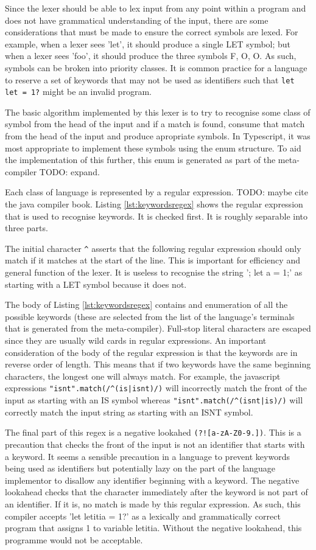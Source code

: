 \documentclass{article}
\begin{document}
Since the lexer should be able to lex input from any point within a program and does not have grammatical understanding of the input, there are some considerations that must be made to ensure the correct symbols are lexed. For example, when a lexer sees 'let', it should produce a single LET symbol; but when a lexer sees 'foo', it should produce the three symbols F, O, O. As such, symbols can be broken into priority classes. It is common practice for a language to reserve a set of keywords that may not be used as identifiers such that \lstinline{let let = 1?} might be an invalid program.

The basic algorithm implemented by this lexer is to try to recognise some class of symbol from the head of the input and if a match is found, consume that match from the head of the input and produce apropriate symbols. In Typescript, it was most appropriate to implement these symbols using the enum structure. To aid the implementation of this further, this enum is generated as part of the meta-compiler TODO: expand.

Each class of language is represented by a regular expression. TODO: maybe cite the java compiler book. 
Listing \ref{lst:keywordsregex} shows the regular expression that is used to recognise keywords. It is checked first. It is roughly separable into three parts.

The initial character \lstinline{^} asserts that the following regular expression should only match if it matches at the start of the line. This is important for efficiency and general function of the lexer. It is useless to recognise the string '; let a = 1;' as starting with a LET symbol because it does not.

The body of Listing \ref{lst:keywordsregex} contains and enumeration of all the possible keywords (these are selected from the list of the language's terminals that is generated from the meta-compiler). Full-stop literal characters are escaped since they are usually wild cards in regular expressions. An important consideration of the body of the regular expression is that the keywords are in reverse order of length. This means that if two keywords have the same beginning characters, the longest one will always match. For example, the javascript expressions \lstinline{"isnt".match(/^(is|isnt)/)} will incorrectly match the front of the input as starting with an IS symbol whereas \lstinline{"isnt".match(/^(isnt|is)/)} will correctly match the input string as starting with an ISNT symbol.

The final part of this regex is a negative lookahed \lstinline{(?![a-zA-Z0-9.])}. This is a precaution that checks the front of the input is not an identifier that starts with a keyword. It seems a sensible precaution in a language to prevent keywords being used as identifiers but potentially lazy on the part of the language implementor to disallow any identifier beginning with a keyword. The negative lookahead checks that the character immediately after the keyword is not part of an identifier. If it is, no match is made by this regular expression. As such, this compiler accepts 'let letitia = 1?' as a lexically and grammatically correct program that assigns 1 to variable letitia. Without the negative lookahead, this programme would not be acceptable.
\end{document}
